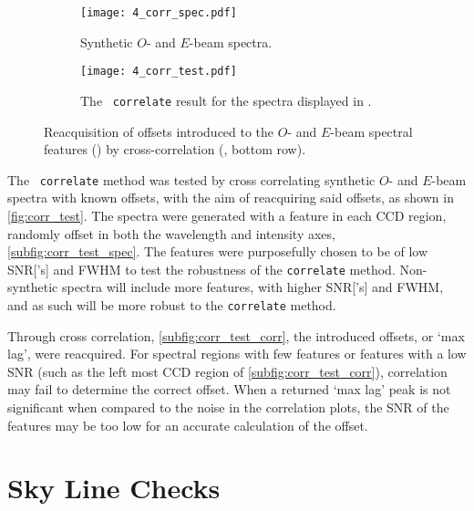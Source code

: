 \begin{figure}
    \centering
    \begin{subfigure}[b]{\textwidth}
        \centering
        \texttt{[image: 4\_corr\_spec.pdf]}
        \caption{Synthetic $O$- and $E$-beam spectra.}
        \label{subfig:corr_test_spec}
    \end{subfigure}
    \hfill
    \begin{subfigure}[b]{\textwidth}
        \centering
        \texttt{[image: 4\_corr\_test.pdf]}
        \caption{The \stops\ \texttt{correlate} result for the spectra displayed in .}
        \label{subfig:corr_test_corr}
    \end{subfigure}
    \caption{Reacquisition of offsets introduced to the $O$- and $E$-beam spectral features () by cross-correlation (, bottom row).}
    \label{fig:corr_test}
\end{figure}

The \stops\ \texttt{correlate} method was tested by cross correlating synthetic $O$- and $E$-beam spectra with known offsets, with the aim of reacquiring said offsets, as shown in \autoref{fig:corr_test}.
The spectra were generated with a feature in each \gls{CCD} region, randomly offset in both the wavelength and intensity axes, \autoref{subfig:corr_test_spec}. The features were purposefully chosen to be of low \gls{SNR}['s] and \gls{FWHM} to test the robustness of the \texttt{correlate} method. Non-synthetic spectra will include more features, with higher \gls{SNR}['s] and \gls{FWHM}, and as such will be more robust to the \texttt{correlate} method.

Through cross correlation, \autoref{subfig:corr_test_corr}, the introduced offsets, or `max lag', were reacquired.
For spectral regions with few features or features with a low \gls{SNR} (such as the left most \gls{CCD} region of \autoref{subfig:corr_test_corr}), correlation may fail to determine the correct offset.
When a returned `max lag' peak is not significant when compared to the noise in the correlation plots, the \gls{SNR} of the features may be too low for an accurate calculation of the offset.

\section{Sky Line Checks} \label{subsec:test_sky}

